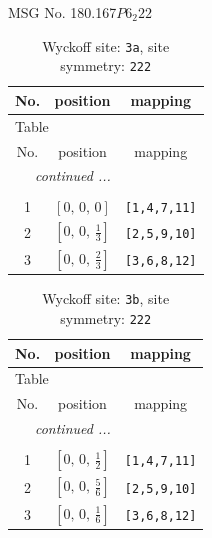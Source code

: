 \documentclass[fleqn,8pt]{jsarticle}
\begin{document}
\setcounter{MaxMatrixCols}{32}

\renewcommand{\tablename}{Table~}
\renewcommand{\figurename}{Figure~}
\begin{center}
\LARGE
MSG No. 180.167\quad$P6_{2}22$
\end{center}
\renewcommand{\arraystretch}{1.2}
\begin{longtable}{ccc}
\caption{Wyckoff site: {\tt 3a}, site symmetry: {\tt 222}}
 \\
 \hline \hline
No. & position & mapping \\ \hline \endfirsthead

\multicolumn{2}{l}{\tablename\ \thetable{}} \\
 \hline \hline
No. & position & mapping \\ \hline \endhead

 \hline \hline
\multicolumn{2}{r}{\footnotesize\it continued ...} \\ \endfoot

 \hline \hline
\multicolumn{2}{r}{} \\ \endlastfoot

1 & $\left[ 0,\, 0,\, 0 \right]$ & {\tt [1,4,7,11]} \\ \hline
2 & $\left[ 0,\, 0,\, \frac{1}{3} \right]$ & {\tt [2,5,9,10]} \\ \hline
3 & $\left[ 0,\, 0,\, \frac{2}{3} \right]$ & {\tt [3,6,8,12]} \\
\end{longtable}
\renewcommand{\arraystretch}{1.2}
\begin{longtable}{ccc}
\caption{Wyckoff site: {\tt 3b}, site symmetry: {\tt 222}}
 \\
 \hline \hline
No. & position & mapping \\ \hline \endfirsthead

\multicolumn{2}{l}{\tablename\ \thetable{}} \\
 \hline \hline
No. & position & mapping \\ \hline \endhead

 \hline \hline
\multicolumn{2}{r}{\footnotesize\it continued ...} \\ \endfoot

 \hline \hline
\multicolumn{2}{r}{} \\ \endlastfoot

1 & $\left[ 0,\, 0,\, \frac{1}{2} \right]$ & {\tt [1,4,7,11]} \\ \hline
2 & $\left[ 0,\, 0,\, \frac{5}{6} \right]$ & {\tt [2,5,9,10]} \\ \hline
3 & $\left[ 0,\, 0,\, \frac{1}{6} \right]$ & {\tt [3,6,8,12]} \\
\end{longtable}
\end{document}
